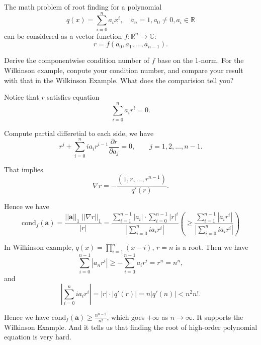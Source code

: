\documentclass[11pt]{elegantbook}
\begin{document}
\vspace{1em}

\begin{problem}
  The math problem of root finding for a polynomial
  \begin{equation}
    q(x)=\sum_{i=0}^n a_ix^i, \quad a_n=1,a_0\neq 0,a_i\in \mathbb{R}
  \end{equation}
  can be considered as a vector function $f:\mathbb{R}^n \to \mathbb{C}$:
  \begin{equation*}
    r=f(a_0,a_1,...,a_{n-1}).
  \end{equation*}

  Derive the componentwise condition number of $f$ base on the 1-norm. For the Wilkinson example, conpute your condition number, and compare your result with that in the Wilkinson Example. What does the comparision tell you?
\end{problem}

\begin{solution}
  Notice that $r$ satisfies equation
  \begin{equation*}
    \sum_{i=0}^n a_ir^i = 0.
  \end{equation*}
  
  Compute partial differetial to each side, we have
  \begin{equation*}
    r^j + \sum_{i=0}^n ia_ir^{i-1}\frac{\partial r}{\partial a_j} = 0, \qquad j=1,2,...,n-1.
  \end{equation*}

  That implies 
  \begin{equation*}
    \nabla r = -\frac{(1, r, ..., r^{n-1})}{q'(r)}.
  \end{equation*}

  Hence we have
  \begin{equation*}
    \text{cond}_f(\mathbf{a})=\frac{||\mathbf{a}||_1\;||\nabla r||_1}{|r|}=\frac{\sum_{i=1}^{n-1} |a_i|\cdot\sum_{i=0}^{n-1} |r|^i}{\left|\sum_{i=0}^n ia_ir^i\right|} \left(\geq \frac{\sum_{i=1}^{n-1} |a_ir^i|}{\left|\sum_{i=0}^n ia_ir^i\right|}\right)
  \end{equation*}

  In Wilkinson example, $q(x)=\prod_{i=1}^n (x-i)$, $r=n$ is a root. Then we have
  \begin{equation*}
    \sum_{i=0}^{n-1}|a_nr^i| \geq -\sum_{i=0}^{n-1} a_ir^i = r^n = n^n,
  \end{equation*}
  and
  \begin{equation*}
    \left|\sum_{i=0}^n ia_ir^i\right| = |r| \cdot |q'(r)| = n|q'(n)| < n^2 n!.
  \end{equation*}

  Hence we have $\text{cond}_f(\mathbf{a})\geq \frac{n^{n-2}}{n!}$, which goes $+\infty$ as $n\to \infty$. It supports the Wilkinson Example. And it tells us that finding the root of high-order polynomial equation is very hard.
\end{solution}
\end{document}
